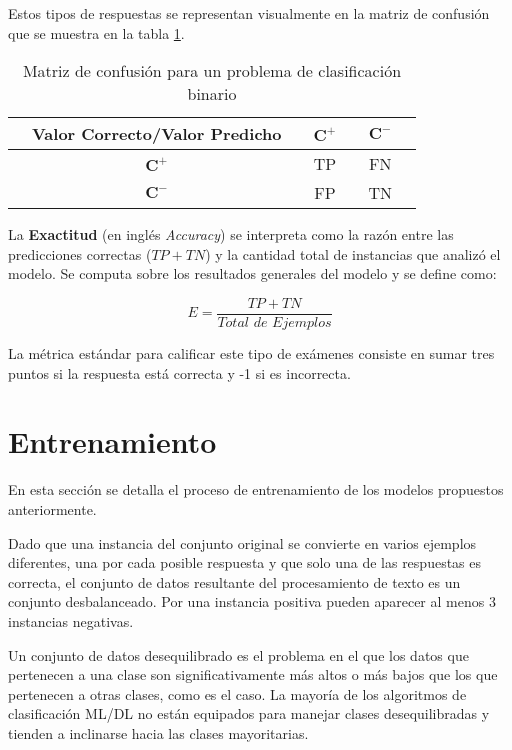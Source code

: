 Estos tipos de respuestas se representan visualmente en la matriz de confusión que se muestra en la tabla \ref{tab:confusion}.

\begin{table}[h!]
  \caption{Matriz de confusión para un problema de clasificación binario}
  \begin{center}
    \begin{tabular}{ccc|cc|cc}
        & Valor Correcto/Valor Predicho &    & $\mathbf{C}^{\boldsymbol{+}}$ & & $\mathbf{C}^{\boldsymbol{-}}$  \\
        \hline
        & $\mathbf{C}^{\boldsymbol{+}}$ &   & TP & & FN  \\
        \hline
        & $\mathbf{C}^{\boldsymbol{-}}$ &   & FP & & TN  \\
    \end{tabular}
  \end{center}
  \label{tab:confusion}
\end{table}

La \textbf{Exactitud} (en inglés \textit{Accuracy}) se interpreta como la razón entre las predicciones correctas ($TP + TN$) y la cantidad total de instancias que analizó el modelo. Se computa sobre los resultados generales del modelo y se define como:

\begin{equation}
  E = \frac{TP + TN}{\textit{Total de Ejemplos}}
\end{equation}

La métrica estándar para calificar este tipo de exámenes consiste en sumar tres puntos si la respuesta está correcta y -1 si es incorrecta.

\section{Entrenamiento}

En esta sección se detalla el proceso de entrenamiento de los modelos propuestos anteriormente. 

Dado que una instancia del conjunto original se convierte en varios ejemplos diferentes, una por cada posible respuesta y que solo una de las respuestas es correcta, el conjunto de datos resultante del procesamiento de texto es un conjunto desbalanceado. Por una instancia positiva pueden aparecer al menos 3 instancias negativas.

Un conjunto de datos desequilibrado es el problema en el que los datos que pertenecen a una clase son significativamente más altos o más bajos que los que pertenecen a otras clases, como es el caso. La mayoría de los algoritmos de clasificación ML/DL no están equipados para manejar clases desequilibradas y tienden a inclinarse hacia las clases mayoritarias.

